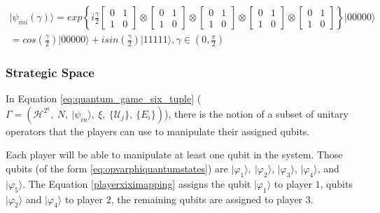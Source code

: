 \begin{center}
\begin{equation}
\begin{split}
\vert\psi_{ini}(\gamma)\rangle=exp\left\{ i\frac{\gamma}{2}\left[\begin{array}{cc}
0 & 1\\
1 & 0
\end{array}\right]\otimes\left[\begin{array}{cc}
0 & 1\\
1 & 0
\end{array}\right]\otimes\left[\begin{array}{cc}
0 & 1\\
1 & 0
\end{array}\right]\otimes\left[\begin{array}{cc}
0 & 1\\
1 & 0
\end{array}\right]\otimes\left[\begin{array}{cc}
0 & 1\\
1 & 0
\end{array}\right]\right\} \vert00000\rangle \\
=cos(\frac{\gamma}{2})\vert00000\rangle+isin(\frac{\gamma}{2})\vert11111\rangle,\gamma\in(0,\frac{\pi}{2})
\end{split}
\label{eq:estado_inicial_pg}
\end{equation}
\end{center}



\subsubsection{Strategic Space}
\label{subsec:strategic_space}

In Equation \ref{eq:quantum_game_six_tuple} ($\Gamma=(\mathcal{H}^{2^{a}},\: N,\:\vert\psi_{in}\rangle,\:\xi,\:\{\mathcal{U}_{j}\},\:\{E_{i}\})
$), there is the notion of a subset of unitary operators that the players can use to manipulate their assigned qubits.

Each player will be able to manipulate at least one qubit in the system. Those qubits (of the form \ref{eq:opvarphiquantumstates}) are $\vert\varphi_{1}\rangle,\:\vert\varphi_{2}\rangle$, $\vert\varphi_{3}\rangle$, $\vert\varphi_{4}\rangle$, and $\vert\varphi_{5}\rangle$. The Equation \ref{playerxiximapping} assigns the qubit $\vert\varphi_{1}\rangle$ to player $1$, qubits $\vert\varphi_{2}\rangle$ and $\vert\varphi_{4}\rangle$ to player $2$, the remaining qubits are assigned to player $3$. 

